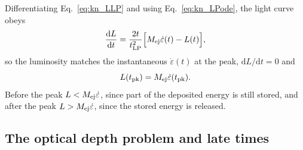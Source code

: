 Differentiating Eq.~\ref{eq:kn_LLP} and using Eq.~\ref{eq:kn_LPode}, the light curve obeys
\begin{equation}\label{eq:kn_Lode}
  \frac{\mathrm{d}L}{\mathrm{d}t}=\frac{2t}{t_{\rm LP}^2}\Big[M_{\rm ej}\dot\varepsilon(t)-L(t)\Big],
\end{equation}
so the luminosity matches the instantaneous $\dot\varepsilon(t)$ at the peak, $\mathrm{d}L/\mathrm{d}t=0$ and
\begin{equation}\label{eq:kn_arnett}
  L(t_{\rm pk})=M_{\rm ej}\dot\varepsilon(t_{\rm pk}).
\end{equation}
Before the peak $L<M_{\rm ej}\dot\varepsilon$, since part of the deposited energy is still stored, and after the peak $L>M_{\rm ej}\dot\varepsilon$, since the stored energy is released.



\subsection{The optical depth problem and late times}\label{sec:onezone_late}

